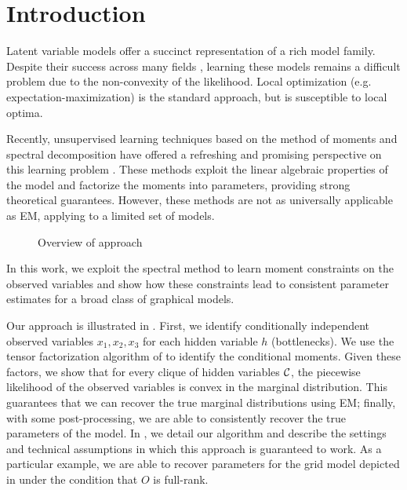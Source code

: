 \section{Introduction}
\label{sec:introduction}

Latent variable models offer a succinct representation of a rich model
family. 
Despite their success across many fields
\cite{quattoni04crf,haghighi06prototype,liang06discrimative,kirkpatrick10painless},
learning these models remains a difficult problem due to the
non-convexity of the likelihood. Local optimization (e.g.
expectation-maximization) is the standard approach, but is susceptible
to local optima.

Recently, unsupervised learning techniques based on the method of moments and
spectral decomposition have offered a refreshing and promising perspective on
this learning problem \citep{hsu09spectral,anandkumar11tree,anandkumar12moments,anandkumar12lda,hsu12identifiability,balle11transducer,balle12automata}.
These methods exploit the linear algebraic properties of the model and
factorize the moments into parameters, providing strong theoretical guarantees.
However, these methods are not as universally applicable as EM, applying to a limited set of models.

\begin{figure*}
  \centering
  
  \caption{Overview of approach}
\end{figure*}

In this work, we exploit the spectral method to learn moment constraints
on the observed variables and show how these constraints lead to consistent parameter estimates for a broad class of graphical models.

Our approach is illustrated in . 
First, we identify conditionally independent observed variables $x_1,
  x_2, x_3$ for each hidden variable $h$ (bottlenecks). 
We use the tensor factorization algorithm of
  \citet{anandkumar12moments,anandkumar13tensor} to identify the
  conditional moments.
Given these factors, we show that for every clique of hidden variables
  $\mathcal{C}$, the piecewise likelihood of the observed variables is convex in
  the marginal distribution. 
This guarantees that we can recover the true marginal distributions
  using EM; finally, with some post-processing, we are able to
  consistently recover the true parameters of the model.
In , we detail our algorithm and describe the
  settings and technical assumptions in which this approach is guaranteed
  to work.
As a particular example, we are able to recover parameters for the
  grid model depicted in  under the condition that
  $O$ is full-rank.

